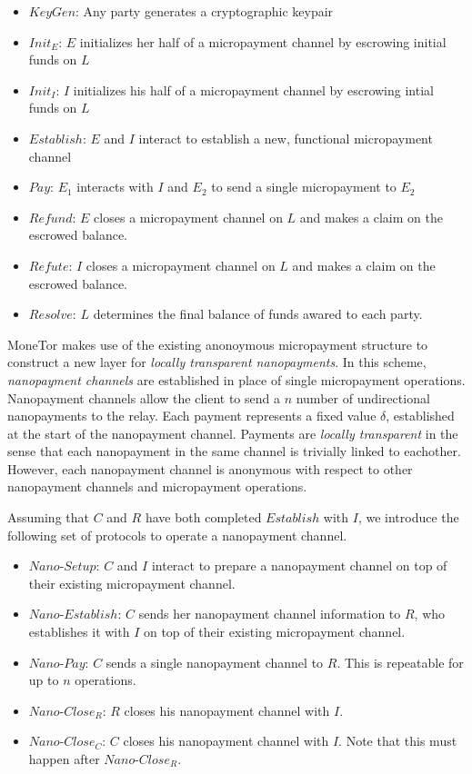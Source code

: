 \begin{itemize}
\item $KeyGen$: Any party generates a cryptographic keypair
\item $Init_E$: $E$ initializes her half of a micropayment channel by escrowing
  initial funds on $L$
\item $Init_I$: $I$ initializes his half of a micropayment channel by
  escrowing intial funds on $L$
\item $Establish$: $E$ and $I$ interact to establish a new, functional
  micropayment channel
\item $Pay$: $E_1$ interacts with $I$ and $E_2$ to send a single micropayment to $E_2$
\item $Refund$: $E$ closes a micropayment channel on $L$ and makes a claim on
  the escrowed balance.
\item $Refute$: $I$ closes a micropayment channel on $L$ and makes a claim on
  the escrowed balance.
\item $Resolve$: $L$ determines the final balance of funds awared to
  each party.
\end{itemize}

MoneTor makes use of the existing anonoymous micropayment structure to construct
a new layer for \emph{locally transparent nanopayments}. In this scheme,
\emph{nanopayment channels} are established in place of single micropayment
operations. Nanopayment channels allow the client to send a $n$ number of
undirectional nanopayments to the relay. Each payment represents a fixed value
$\delta$, established at the start of the nanopayment channel. Payments are
\emph{locally transparent} in the sense that each nanopayment in the same
channel is trivially linked to eachother. However, each nanopayment channel is
anonymous with respect to other nanopayment channels and micropayment
operations.

Assuming that $C$ and $R$ have both completed $Establish$ with $I$, we introduce
the following set of protocols to operate a nanopayment channel.

\begin{itemize}
\item $Nano$-$Setup$: $C$ and $I$ interact to prepare a nanopayment channel on top
  of their existing micropayment channel.
\item $Nano$-$Establish$: $C$ sends her nanopayment channel information to $R$,
  who establishes it with $I$ on top of their existing micropayment channel.
\item $Nano$-$Pay$: $C$ sends a single nanopayment channel to $R$. This is
  repeatable for up to $n$ operations.
\item $Nano$-$Close_R$: $R$ closes his nanopayment channel with $I$.
\item $Nano$-$Close_C$: $C$ closes his nanopayment channel with $I$. Note that
  this must happen after $Nano$-$Close_R$.
\end{itemize}

